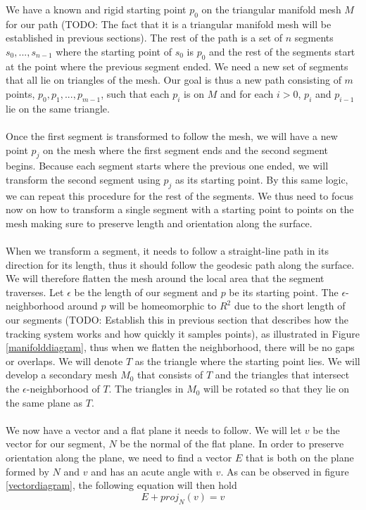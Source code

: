 We have a known and rigid starting point $p_0$ on the triangular manifold mesh $M$ for our path (TODO: The fact that it is a triangular manifold mesh will be established in previous sections). The rest of the path is a set of $n$ segments $s_0,...,s_{n-1}$ where the starting point of $s_0$ is $p_0$ and the rest of the segments start at the point where the previous segment ended. We need a new set of segments that all lie on triangles of the mesh. Our goal is thus a new path consisting of $m$ points, $p_0, p_1,...,p_{m-1}$, such that each $p_i$ is on $M$ and for each $i>0$, $p_{i}$ and $p_{i-1}$ lie on the same triangle. \\
\\
Once the first segment is transformed to follow the mesh, we will have a new point $p_j$ on the mesh where the first segment ends and the second segment begins. Because each segment starts where the previous one ended, we will transform the second segment using $p_j$ as its starting point. By this same logic, we can repeat this procedure for the rest of the segments. We thus need to focus now on how to transform a single segment with a starting point to points on the mesh making sure to preserve length and orientation along the surface. \\
\\
When we transform a segment, it needs to follow a straight-line path in its direction for its length, thus it should follow the geodesic path along the surface. We will therefore flatten the mesh around the local area that the segment traverses. Let $\epsilon$ be the length of our segment and $p$ be its starting point. The $\epsilon$-neighborhood around $p$ will be homeomorphic to $R^2$ due to the short length of our segments (TODO: Establish this in previous section that describes how the tracking system works and how quickly it samples points), as illustrated in Figure \ref{manifolddiagram}, thus when we flatten the neighborhood, there will be no gaps or overlaps. We will denote $T$ as the triangle where the starting point lies. We will develop a secondary mesh $M_0$ that consists of $T$ and the triangles that intersect the $\epsilon$-neighborhood of $T$. The triangles in $M_0$ will be rotated so that they lie on the same plane as $T$. \\
\\
We now have a vector and a flat plane it needs to follow. We will let $v$ be the vector for our segment, $N$ be the normal of the flat plane. In order to preserve orientation along the plane, we need to find a vector $E$ that is both on the plane formed by $N$ and $v$ and has an acute angle with $v$. As can be observed in figure \ref{vectordiagram}, the following equation will then hold
\[
E + proj_N(v) = v
\]

